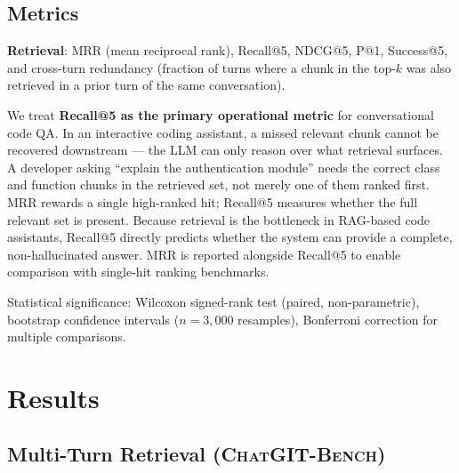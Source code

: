 \documentclass[runningheads]{llncs}
\newcommand{\conv}{\textsc{ChatGIT-Bench}\xspace}
\begin{document}
\subsection{Metrics}

\textbf{Retrieval}: MRR (mean reciprocal rank), Recall@5,
NDCG@5, P@1, Success@5, and cross-turn redundancy (fraction of
turns where a chunk in the top-$k$ was also retrieved in a prior
turn of the same conversation).

We treat \textbf{Recall@5 as the primary operational metric} for
conversational code QA. In an interactive coding assistant, a
missed relevant chunk cannot be recovered downstream --- the LLM
can only reason over what retrieval surfaces. A developer asking
``explain the authentication module'' needs the correct class and
function chunks in the retrieved set, not merely one of them ranked
first. MRR rewards a single high-ranked hit; Recall@5 measures
whether the full relevant set is present. Because retrieval is the
bottleneck in RAG-based code assistants, Recall@5 directly predicts
whether the system can provide a complete, non-hallucinated answer.
MRR is reported alongside Recall@5 to enable comparison with
single-hit ranking benchmarks.

Statistical significance: Wilcoxon signed-rank test (paired,
non-parametric), bootstrap confidence intervals ($n{=}3{,}000$
resamples), Bonferroni correction for multiple comparisons.

\section{Results}
\label{sec:results}

\subsection{Multi-Turn Retrieval (\conv)}
\end{document}
